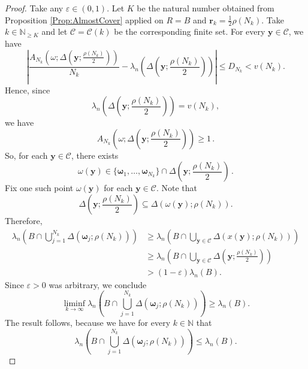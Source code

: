 \documentclass{amsart}
\theoremstyle{definition}
\newcommand{\N}{\mathbb N}%
\newcommand{\0}{\mbf 0}%
\def\N{\mathbb N}
\begin{document}
\begin{proof}
Take any $\varepsilon\in (0,1)$. Let $K$ be the natural number obtained from Proposition \ref{Prop:AlmostCover} applied on $R=B$ and $\mathbf{r}_k =\frac{1}{2} \rho(N_k)$. Take $k\in\N_{\geq K}$ and let $\mathcal{C}=\mathcal{C}(k)$ be the corresponding finite set. For every $\mathbf{y}\in \mathcal{C}$, we have 
\[
\left| 
\frac{A_{N_k}\left(\omega;\Delta\left(\mathbf{y}; \frac{\rho(N_k)}{2}\right) \right)}{N_k} -
 \lambda_n\left(\Delta\left(\mathbf{y}; \frac{\rho(N_k)}{2} \right)\right)
\right|
\leq 
D_{N_k} < v(N_k).
\]
Hence, since
\[
 \lambda_n\left(\Delta\left(\mathbf{y}; \frac{\rho(N_k)}{2} \right)\right) = v(N_k),
\]
we have
\[
A_{N_k}\left(\omega;\Delta\left(\mathbf{y}; \frac{\rho(N_k)}{2}\right) \right)\geq 1\, .
\]
So, for each $\mathbf{y}\in \mathcal{C}$, there exists 
\[
\omega(\mathbf{y})
\in 
\{\boldsymbol{\omega}_1,\ldots, \boldsymbol{\omega}_{N_k}\}\cap \Delta\left(\mathbf{y}; \frac{\rho(N_k)}{2} \right)\, .
\]
Fix one such point $\omega(\mathbf{y})$ for each $\mathbf{y}\in\mathcal{C}$. Note that 
\[
\Delta\left(\mathbf{y}; \frac{\rho(N_k)}{2} \right)
\subseteq
\Delta\left(\omega(\mathbf{y}); \rho(N_k) \right).
\]
Therefore, 
\begin{align*}
\lambda_n\left( B\cap\bigcup_{j=1}^{N_k} \Delta(\boldsymbol{\omega}_j;\rho(N_k))\right)
&\geq
\lambda_n\left( B\cap\bigcup_{\mathbf{y}\in \mathcal{C}} \Delta(x(\mathbf{y}) ;\rho(N_k))\right) \\
&\geq
\lambda_n\left( B\cap\bigcup_{\mathbf{y}\in \mathcal{C}} \Delta\left(\mathbf{y} ;\frac{\rho(N_k)}{2} \right)\right) \\
&>
(1-\varepsilon) \lambda_n(B).
\end{align*}
Since $\varepsilon>0$ was arbitrary, we conclude
\[
\liminf_{k\to\infty} \lambda_n\left( B\cap\bigcup_{j=1}^{N_k} \Delta(\boldsymbol{\omega}_j;\rho(N_k))\right)
\geq 
\lambda_n(B).
\]
The result follows, because we have for every $k\in\mathbb{N}$ that
\[
\lambda_n\left( B\cap\bigcup_{j=1}^{N_k} \Delta(\boldsymbol{\omega}_j;\rho(N_k))\right)
\leq 
\lambda_n(B).
\]
\end{proof}
\end{document}
